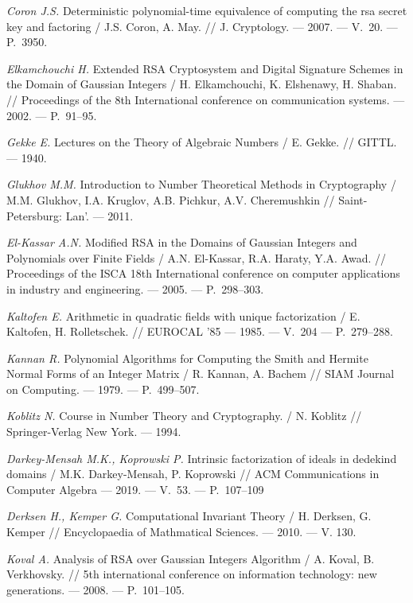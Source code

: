 \begin{thebibliography}{99}
\textit{Coron J.S.} Deterministic polynomial-time equivalence of computing the rsa secret key and factoring / J.S. Coron, A. May. // J. Cryptology. --- 2007. --- V.~20. --- P.~3950.

\textit{Elkamchouchi H.} Extended RSA Cryptosystem and Digital Signature Schemes in the Domain of Gaussian Integers / H. Elkamchouchi, K. Elshenawy, H. Shaban. // Proceedings of the 8th International conference on communication systems. --- 2002. --- P.~91--95.

\textit{Gekke E.} Lectures on the Theory of Algebraic Numbers / E. Gekke. // GITTL. --- 1940.

\textit{Glukhov M.M.} Introduction to Number Theoretical Methods in Cryptography / M.M. Glukhov, I.A. Kruglov, A.B. Pichkur, A.V. Cheremushkin // Saint-Petersburg: Lan'. --- 2011.

\textit{El-Kassar A.N.} Modified RSA in the Domains of Gaussian Integers and Polynomials over Finite Fields / A.N. El-Kassar, R.A. Haraty, Y.A. Awad. // Proceedings of the ISCA 18th International conference on computer applications in industry and engineering. --- 2005. --- P.~298--303.

\textit{Kaltofen E.} Arithmetic in quadratic fields with unique factorization / E. Kaltofen, H. Rolletschek. // EUROCAL '85 --- 1985. --- V.~204 --- P.~279--288.

\textit{Kannan R.} Polynomial Algorithms for Computing the Smith and Hermite Normal Forms of an Integer Matrix / R. Kannan, A. Bachem // SIAM Journal on Computing. --- 1979. --- P.~499--507.

\textit{Koblitz N.} Course in Number Theory and Cryptography. / N. Koblitz // Springer-Verlag New York. --- 1994.

\textit{Darkey-Mensah M.K., Koprowski P.} Intrinsic factorization of ideals in dedekind domains / M.K. Darkey-Mensah, P. Koprowski // ACM Communications in Computer Algebra --- 2019. --- V.~53. --- P.~107--109

\textit{Derksen H., Kemper G.} Computational Invariant Theory / H. Derksen, G. Kemper // Encyclopaedia of Mathmatical Sciences. --- 2010. --- V. 130.

\textit{Koval A.} Analysis of RSA over Gaussian Integers Algorithm / A. Koval, B. Verkhovsky. // 5th international conference on information technology: new generations. --- 2008. --- {P.}~101--105.


\end{thebibliography}

